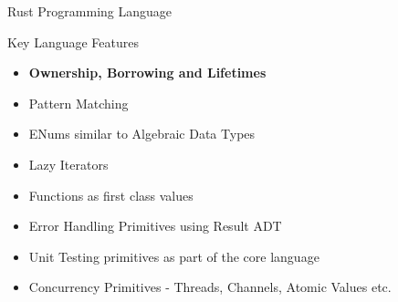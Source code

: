 \begin{section}{Rust Programming Language}
  \begin{frame}{Key Language Features}
    \begin{itemize}
    \item \textbf{Ownership, Borrowing and Lifetimes}
    \item Pattern Matching
    \item ENums similar to Algebraic Data Types
    \item Lazy Iterators
    \item Functions as first class values
    \item Error Handling Primitives using Result ADT
    \item Unit Testing primitives as part of the core language
    \item Concurrency Primitives - Threads, Channels, Atomic Values etc.
    \end{itemize}
  \end{frame}
\end{section}
